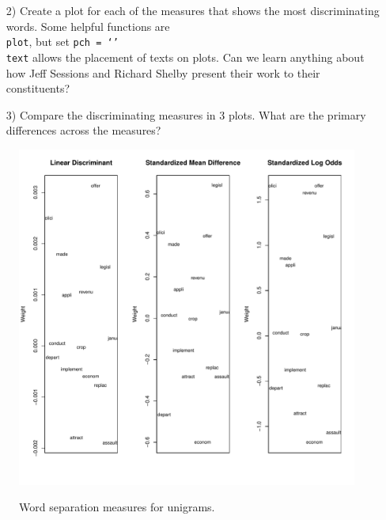 \documentclass[12pt,letterpaper]{article}
\begin{document}


\begin{itemize}
\item[2)] Create a plot for each of the measures that shows the most discriminating words.  Some helpful functions are \\
{\tt plot}, but set {\tt pch = `'} \\
{\tt text}  allows the placement of texts on plots. Can we learn anything about how Jeff Sessions and Richard Shelby present their work to their constituents?\\
\end{itemize}



\begin{itemize}
\item[3)] Compare the discriminating measures in 3 plots.  What are the primary differences across the measures?
\end{itemize}

\begin{figure}[H]
  \caption{\footnotesize{Word separation measures for unigrams.}}
  \centering
   \includegraphics[width=.65\linewidth]{HW2wordDistanceUnigrams.pdf}\\
\end{figure}
\end{document}
